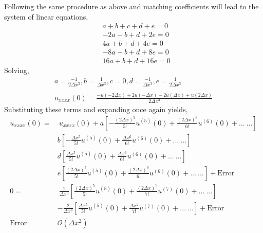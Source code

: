 \documentclass[11pt]{article}
\newcommand{\Oc}{\mathcal{O}}
\newcommand{\dx}{\Delta x}
\newcommand{\uxxx}{u_{xxxx}(0)}
\newcommand{\ufive}{u^{(5)}(0)}
\begin{document}
\begin{enumerate}
\begin{enumerate}
    Following the same procedure as above and matching coefficients will lead to the system of linear equations,
    \begin{align*}
    & a+b+c+d+e = 0 \\
    & -2a-b+d+2e = 0 \\
    & 4a+b+d+4e = 0 \\
    & -8a-b+d+8e = 0 \\
    & 16a+b+d+16e = 0 
    \end{align*}
    Solving,
    \begin{align*}
    a = \frac{-1}{2\dx^3}, b = \frac{1}{\dx^3}, c = 0, d = \frac{-1}{\dx^3}, e = \frac{1}{2\dx^3} \\ \\
    \uxxx = \frac{-u(-2\dx) + 2u(-\dx) -2u(\dx) + u(2\dx)}{2\dx^3}
    \end{align*}
    Substituting these terms and expanding once again yields,
    \begin{align*}
    \uxxx = & \ \uxxx + a\left[ -\frac{(2\dx)^5}{5!}\ufive + \frac{(2\dx)^6}{6!}u^{(6)}(0) + ... \ ...\right] \\
     & b\left[-\frac{\dx^5}{5!}\ufive + \frac{\dx^6}{6!}u^{(6)}(0) + ... \ ...\right] \\
     & d\left[\frac{\dx^5}{5!} \ufive + \frac{\dx^6}{6!}u^{(6)}(0)+ ... \ ...\right] \\
     & e\left[\frac{(2\dx)^5}{5!}\ufive + \frac{(2\dx)^6}{6!}u^{(6)}(0) +... \ ... \right] + \text{Error} \\
     0 = &\ \frac{1}{\dx^3}\left[\frac{(2\dx)^5}{5!}\ufive + \frac{(2\dx)^7}{7!}u^{(7)}(0) + ... \ ...\right] \\
     & - \frac{2}{\dx^3}\left[\frac{\dx^5}{5!}\ufive + \frac{\dx^7}{7!}u^{(7)}(0) + ... \ ... \right] + \text{Error} \\
     \text{Error} = & \Oc(\dx^2)
    \end{align*}
    
  \end{enumerate}
  

\end{enumerate}
\end{document}
